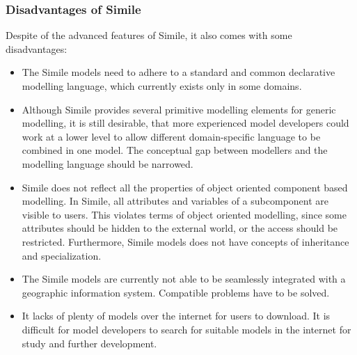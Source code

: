 \subsubsection{Disadvantages of Simile}
\par
Despite of the advanced features of Simile, it also comes with some disadvantages:
\begin{itemize}
\item 
The Simile models need to adhere to a standard and common declarative modelling language, which currently exists only in some domains.
\item
Although Simile provides several primitive modelling elements for generic modelling, it is still desirable, that more experienced model developers could work at a lower level to allow different domain-specific language to be combined in one model. The conceptual gap between modellers and the modelling language should be narrowed. \autocite{dsl:simile-muetzelfeldt}
\item
Simile does not reflect all the properties of object oriented component based modelling.  In Simile, all attributes and variables of a subcomponent are visible to users. This violates terms of object oriented modelling, since some attributes should be hidden to the external world, or the access should be restricted. Furthermore, Simile models does not have concepts of inheritance and specialization. \autocite{dsl:simile-muetzelfeldt}
\item
The Simile models are currently not able to be seamlessly integrated with a geographic information system.  Compatible problems have to be solved.
\item 
It lacks of plenty of models over the internet for users to download. It is difficult for model developers to search for suitable models in the internet for study and further development.
\end{itemize}





















